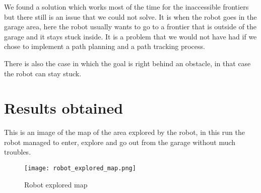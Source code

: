 We found a solution which works most of the time for the inaccessible frontiers but there still is an issue that we could not solve.
It is when the robot goes in the garage area, here the robot usually wants to go to a frontier that is outside of the garage and it stays stuck inside.
It is a problem that we would not have had if we chose to implement a path planning and a path tracking process.

There is also the case in which the goal is right behind an obstacle, in that case the robot can stay stuck.

\section{Results obtained}

This is an image of the map of the area explored by the robot, in this run the robot managed to enter, explore and go out from the garage without much troubles.

\FloatBarrier
\begin{figure}
    \centering\texttt{[image: robot\_explored\_map.png]}
    \label{fig:robot_explored_map}
    \caption{Robot explored map}
\end{figure}
\FloatBarrier

